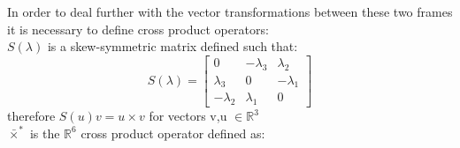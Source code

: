     In order to deal further with the vector transformations between these two frames 
    it is necessary to define cross product operators:\\
    $S(\lambda)$ is a skew-symmetric matrix defined such that:
    $$
    S(\lambda)=\left[\begin{array}{ccc}
        0 & -\lambda_3 & \lambda_2 \\
        \lambda_3 & 0 & -\lambda_1 \\
        -\lambda_2 & \lambda_1 & 0
    \end{array}\right]
    $$ therefore $S(u)v = u \times v$ for vectors v,u $\in \mathbb{R}^{3}$ \\
    $\bar{\times}^*$ is the $\mathbb{R}^{6}$ cross product operator defined as: \\
    

